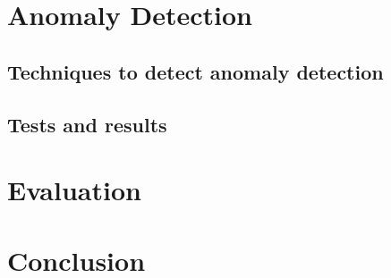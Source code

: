 \documentclass[a4paper]{article}
\begin{document}
\section{Anomaly Detection}
\hspace{5mm} 

\subsection{Techniques to detect anomaly detection}

\hspace{5mm} 

\subsection{Tests and results}

\hspace{5mm} 

\vspace{\baselineskip}

\section{Evaluation}
\hspace{5mm} 

\section{Conclusion}
\hspace{5mm} 

\vspace{\baselineskip}

\end{document}
